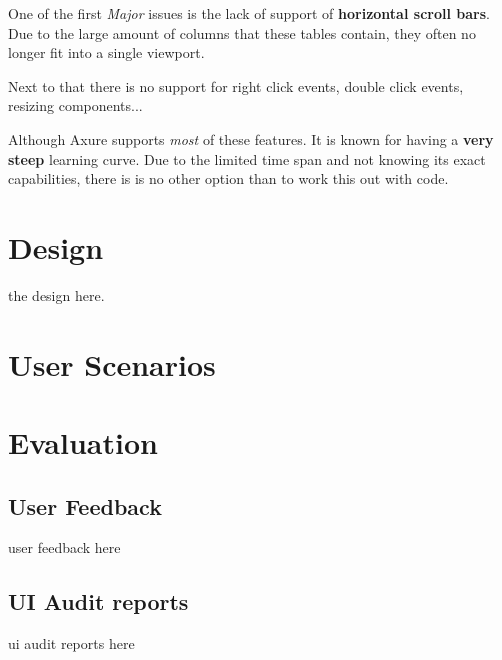     One of the first \textit{Major} issues is the lack of support of \textbf{horizontal scroll bars}. Due to the large amount of columns that these tables contain, they often no longer fit into a single \gls{viewport}.
    
    Next to that there is no support for right click events, double click events, resizing components... 
    
    Although Axure supports \textit{most} of these features. It is known for having a \textbf{very steep} learning curve. Due to the limited time span and not knowing its exact capabilities, there is is no other option than to work this out with code.
    
\section{Design}
    the design here.

\section {User Scenarios}

\section{Evaluation}
    \subsection{User Feedback}
    user feedback here
    \subsection{UI Audit reports}
    ui audit reports here
    
